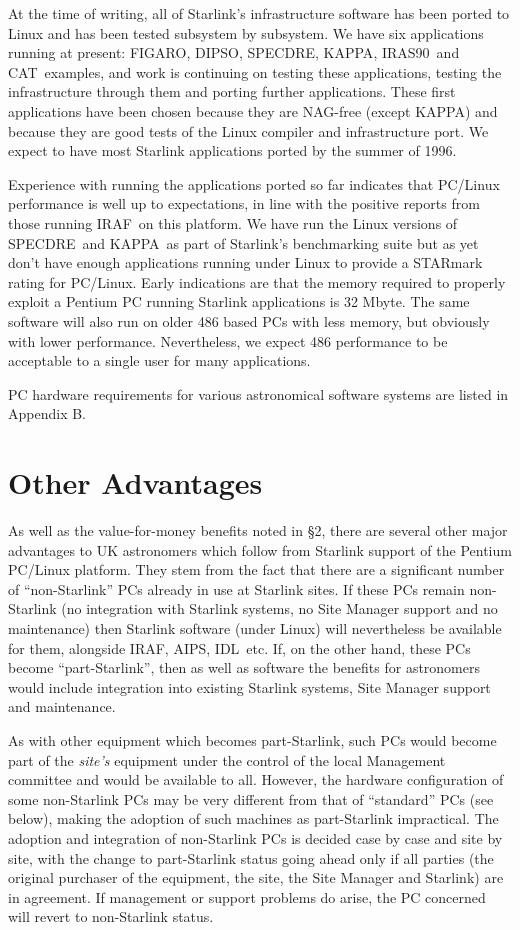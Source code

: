 \documentclass[twoside,11pt]{article}
\newcommand{\htmladdnormallink}[2]{#1}
\newcommand{\xref}[3]{#1}
\newcommand{\CAT}{{\small CAT}\normalsize}
\newcommand{\DIPSO}{{\small DIPSO}\normalsize}
\newcommand{\FIGARO}{{\small FIGARO}\normalsize}
\newcommand{\IRAS}{{\small IRAS90}\normalsize}
\newcommand{\KAPPA}{{\small KAPPA}\normalsize}
\newcommand{\SPECDRE}{{\small SPECDRE}\normalsize}
\newcommand{\CATref} {\xref{\CAT}{sun181}{START}}
\newcommand{\DIPSOref} {\xref{\DIPSO}{sun50}{}}
\newcommand{\FIGAROref}{\xref{\FIGARO}{sun86}{}}
\newcommand{\IRASref}{\xref{\IRAS}{sun163}{}}
\newcommand{\KAPPAref} {\xref{\KAPPA}{sun239}{}}
\newcommand{\AIPS}{\small{AIPS}\normalsize}
\newcommand{\AIPSref}{\htmladdnormallink{\AIPS}{http://www.aips.nrao.edu/}}
\newcommand{\IDL}{\small{IDL}\normalsize}
\newcommand{\IDLref}{\htmladdnormallink{\IDL}{http://rsinc.com/idl/}}
\newcommand{\IRAF}{\small{IRAF}\normalsize}
\newcommand{\IRAFref}{\htmladdnormallink{\IRAF}{http://iraf.noao.edu/iraf-homepage.html}}
\begin{document}
At the time of writing, all of Starlink's infrastructure software has
been ported to Linux and has been tested subsystem by subsystem.  We
have six applications running at present: \FIGAROref, \DIPSOref,
\SPECDRE, \KAPPAref, \IRASref\ and \CATref\ examples, and work is
continuing on testing these applications, testing
the infrastructure through them and porting further applications.
These first applications have been chosen because they
are NAG-free (except \KAPPA) and because they are good tests of the
Linux compiler and infrastructure port. We expect to have most
Starlink applications ported by the summer of 1996.

Experience with running the applications ported so far indicates that
PC/Linux performance is well up to expectations, in line with the
positive reports from those running \IRAFref\ on this platform.  We have run
the Linux versions of \SPECDRE\ and \KAPPA\ as part of Starlink's
benchmarking suite but as yet don't have enough applications running
under Linux to provide a STARmark rating for PC/Linux.  Early
indications are that the memory required to properly exploit a Pentium
PC running Starlink applications is 32 Mbyte.  The same software will
also run on older 486 based PCs with less memory, but obviously with
lower performance.  Nevertheless, we expect 486 performance to be
acceptable to a single user for many applications.

PC hardware requirements for various astronomical software systems are
listed in Appendix B.

\section{Other Advantages}

As well as the value-for-money benefits noted in \S 2, there are
several other major advantages to UK astronomers which follow from
Starlink support of the Pentium PC/Linux platform.  They stem from the
fact that there are a significant number of ``non-Starlink'' PCs
already in use at Starlink sites.  If these PCs remain non-Starlink
(no integration with Starlink systems, no Site Manager support and no
maintenance) then Starlink software (under Linux) will nevertheless be
available for them, alongside \IRAFref, \AIPSref, \IDLref\ etc.  If,
on the other
hand, these PCs become ``part-Starlink'', then as well as software the
benefits for astronomers would include integration into existing
Starlink systems, Site Manager support and maintenance.

As with other equipment which becomes part-Starlink, such PCs would
become part of the {\em site's} equipment under the control of the
local Management committee and would be available to
all.  However, the hardware configuration of some non-Starlink PCs may
be very different from that of ``standard'' PCs (see below), making the
adoption of such machines as part-Starlink impractical.  The
adoption and integration of non-Starlink PCs is decided case by case
and site by site, with the change to part-Starlink status going ahead
only if all parties (the original purchaser of the equipment, the site,
the Site Manager and Starlink) are in agreement.  If management or
support problems do arise, the PC concerned will revert to
non-Starlink status.
\end{document}
